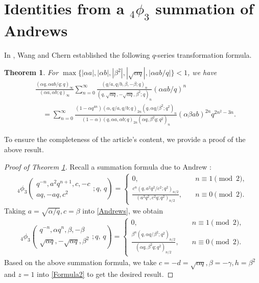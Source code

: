 \documentclass[reqno,12pt]{amsart}
\newtheorem{theorem}{Theorem}[section]%
\theoremstyle{remark}
\numberwithin{equation}{section}
\begin{document}
\section{Identities from a ${_4\phi_3}$ summation of Andrews}
In  \cite{WangChun}, Wang and Chern established  the following $q$-series transformation formula.
\begin{theorem}\label{T4}
For $\max\{|\alpha a|,|\alpha b|,|\beta^2|,|\sqrt{\alpha q}|,|\alpha ab/q|\}<1$, we have
\begin{align*}
&\frac{\left(\alpha q,\alpha ab/q;q\right)_{\infty}}
{\left(\alpha a,\alpha b;q\right)_{\infty}}\sum_{n=0}^{\infty}
\frac{\left(q/a,q/b,\beta,-\beta;q\right)_{n}}
{\left(q,\sqrt{\alpha q},-\sqrt{\alpha q},\beta^2;q\right)_n}\left(\alpha ab/q\right)^n\nonumber\\
&\quad=\sum_{n=0}^{\infty}
\frac{\left(1-\alpha q^{4n}\right)\left(\alpha,q/a,q/b;q\right)_{2n}\left(q,\alpha q/\beta^2;q^2\right)_n}{\left(1-\alpha\right)
\left(q,\alpha a,\alpha b;q\right)_{2n}\left(\alpha q,\beta^2q;q^2\right)_n}\left(\alpha\beta ab\right)^{2n}q^{2n^2-3n}.
\end{align*}
\end{theorem}
To ensure the completeness of the article's content, we provide a proof of the above result. 
\begin{proof}[Proof of Theorem \ref{T4}]
Recall a summation formula due to Andrew \cite{Andrews1}:
\begin{align}
_4\phi_3\left(\begin{array}{cccc}
q^{-n},a^2q^{n+1},c,-c\\
aq,-aq,c^2
\end{array};q,\,q\right)=\left\{\begin{array}{ll}
0,&\quad n\equiv1\pmod2,\\
\frac{c^n\left(q,a^2q^2/c^2;q^2\right)_{n/2}}
{\left(a^2q^2,c^2q;q^2\right)_{n/2}},&\quad n\equiv0\pmod2.
\end{array}\right.\label{Andrews}
\end{align}
Taking $a=\sqrt{\alpha/q}, c=\beta$ into \eqref{Andrews}, we obtain
\begin{align*}
_4\phi_3\left(\begin{array}{cccc}
q^{-n},\alpha q^n,\beta,-\beta\\
\sqrt{\alpha q},-\sqrt{\alpha q},\beta^2
\end{array};q,\,q\right)
=\left\{\begin{array}{ll}
0,&\quad n\equiv1\pmod2,\\
\frac{\beta^n\left(q,\alpha q/\beta^2;q^2\right)_{n/2}}
{\left(\alpha q,\beta^2q;q^2\right)_{n/2}},& \quad{n\equiv0\pmod2}.
\end{array}\right.
\end{align*}
Based on the above summation formula, we take $c=-d=\sqrt{\alpha q}, \beta=-\gamma, h=\beta^2$ and $z=1$ into \eqref{Formula2} to get the desired result.
\end{proof}
\end{document}
